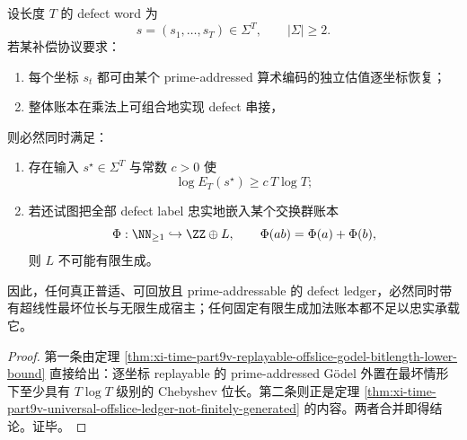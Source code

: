 \begin{theorem}\label{thm:conclusion-replayable-defect-ledger-superlinear-and-infinitely-generated}
设长度 \(T\) 的 defect word 为
\[
s=(s_1,\dots,s_T)\in \Sigma^T,
\qquad
|\Sigma|\ge 2.
\]
若某补偿协议要求：
\begin{enumerate}
  \item 每个坐标 \(s_t\) 都可由某个 prime-addressed 算术编码的独立估值逐坐标恢复；
  \item 整体账本在乘法上可组合地实现 defect 串接，
\end{enumerate}
则必然同时满足：
\begin{enumerate}
  \item 存在输入 \(s^\star\in\Sigma^T\) 与常数 \(c>0\) 使
  \[
  \log E_T(s^\star)\ge c\,T\log T;
  \]
  \item 若还试图把全部 defect label 忠实地嵌入某个交换群账本
  \[
  \Phi:\NN_{\ge 1}\hookrightarrow \ZZ\oplus L,
  \qquad
  \Phi(ab)=\Phi(a)+\Phi(b),
  \]
  则 \(L\) 不可能有限生成。
\end{enumerate}
因此，任何真正普适、可回放且 prime-addressable 的 defect ledger，必然同时带有超线性最坏位长与无限生成宿主；任何固定有限生成加法账本都不足以忠实承载它。
\end{theorem}
\begin{proof}
第一条由定理 \ref{thm:xi-time-part9v-replayable-offslice-godel-bitlength-lower-bound} 直接给出：逐坐标 replayable 的 prime-addressed Gödel 外置在最坏情形下至少具有 \(T\log T\) 级别的 Chebyshev 位长。第二条则正是定理 \ref{thm:xi-time-part9v-universal-offslice-ledger-not-finitely-generated} 的内容。两者合并即得结论。证毕。
\end{proof}

